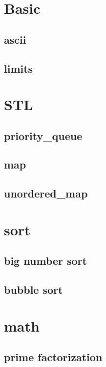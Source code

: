 \section{Basic}
    \subsection{ascii}
        
    \subsection{limits}
        

\section{STL}
    \subsection{priority\_queue}
        
    \subsection{map}
        
    \subsection{unordered\_map}
        

\section{sort}
    \subsection{big number sort}
        
    \subsection{bubble sort}
        

\section{math}
        \subsection{prime factorization}
            

